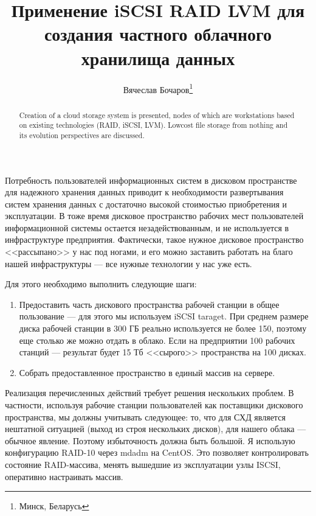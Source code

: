 \documentclass[10pt, a5paper]{article}
\begin{document}
\title{Применение iSCSI RAID LVM для создания частного облачного хранилища данных}%

\author{Вячеслав Бочаров\footnote{Минск, Беларусь}}
\maketitle

\begin{abstract}
Creation of a cloud storage system is presented, nodes of which are workstations based on existing technologies (RAID, iSCSI, LVM). Lowcost file storage from nothing and its evolution \linebreak perspectives are discussed.
\end{abstract}

Потребность пользователей информационных систем в дисковом пространстве для надежного хранения данных приводит к необходимости развертывания систем хранения данных с достаточно высокой стоимостью приобретения и эксплуатации.
В тоже время дисковое пространство рабочих мест пользователей информационной системы остается незадействованным, и не используется в инфраструктуре предприятия.
Фактически, такое нужное дисковое пространство <<рассыпано>> у нас под ногами, и его можно заставить работать на благо нашей инфраструктуры --- все нужные технологии у нас уже есть.

Для этого необходимо выполнить следующие шаги:

\begin{enumerate}
  \item Предоставить часть дискового пространства рабочей станции в общее пользование --- для этого мы используем iSCSI taraget. При среднем размере диска рабочей станции в 300 ГБ реально используется не более 150, поэтому еще столько же можно отдать в облако. Если на предприятии 100 рабочих станций --- результат будет 15 Тб <<сырого>> пространства на 100 дисках.
  \item Собрать предоставленное пространство в единый массив на сервере.
\end{enumerate}

Реализация перечисленных действий требует решения нескольких проблем. 
В частности, используя рабочие станции пользователей как поставщики дискового пространства, мы должны учитывать следующее: то, что для СХД является нештатной ситуацией (выход из строя нескольких дисков),  для нашего облака --- обычное явление. Поэтому избыточность должна быть большой. Я использую конфигурацию RAID-10 через mdadm на CentOS. Это позволяет контролировать состояние RAID-массива, менять вышедшие из эксплуатации узлы ISCSI, оперативно настраивать массив.
\end{document}
